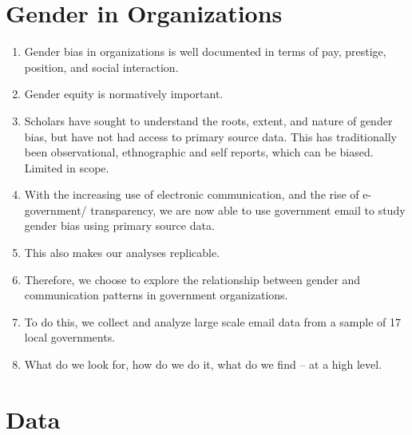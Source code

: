 \documentclass[fleqn]{MJDArticle}
\begin{document}

\section{Gender in Organizations}

\begin{enumerate}
	\item Gender bias in organizations is well documented in terms of pay, prestige, position, and social interaction. 
	\item Gender equity is normatively important.
	\item Scholars have sought to understand the roots, extent, and nature of gender bias, but have not had access to primary source data. This has traditionally been observational, ethnographic and self reports, which can be biased. Limited in scope. 
	\item With the increasing use of electronic communication, and the rise of e-government/ transparency, we are now able to use government email to study gender bias using primary source data.
	\item This also makes our analyses replicable. 
	\item Therefore, we choose to explore the relationship between gender and communication patterns in government organizations. 
	\item To do this, we collect and analyze large scale email data from a sample of 17 local governments.  
	\item What do we look for, how do we do it,  what do we find -- at a high level. 
\end{enumerate}

\section{Data}
\end{document}
